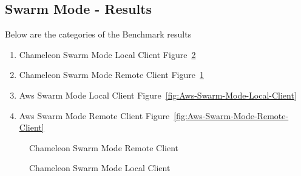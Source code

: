 \documentclass[9pt,twocolumn,twoside]{../../styles/osajnl}
\begin{document}
\subsection{Swarm Mode - Results}

Below are the categories of the Benchmark results
\begin{enumerate}
\item Chameleon Swarm Mode Local Client Figure~\ref{fig:Chameleon-Swarm-Mode-Local-Client}
\item Chameleon Swarm Mode Remote Client Figure~\ref{fig:Chameleon-Swarm-Mode-Remote-Client}
\item Aws Swarm Mode Local Client Figure~\ref{fig:Aws-Swarm-Mode-Local-Client}
\item Aws Swarm Mode Remote Client Figure~\ref{fig:Aws-Swarm-Mode-Remote-Client}
\end{enumerate}

\begin{figure}[ht]
\centering
{}
\caption{Chameleon Swarm Mode Remote Client}
\label{fig:Chameleon-Swarm-Mode-Remote-Client}
\end{figure}

\begin{figure}[ht]
\centering
{}
\caption{Chameleon Swarm Mode Local Client}
\label{fig:Chameleon-Swarm-Mode-Local-Client}
\end{figure}
\end{document}
